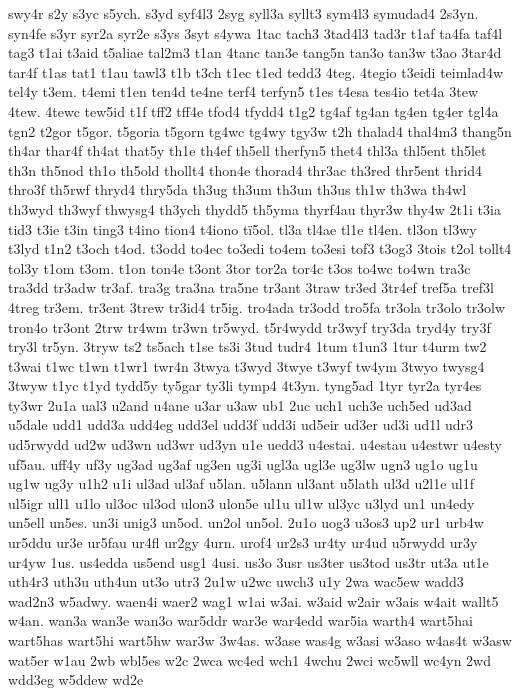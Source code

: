 {swy4r
s2y
s3yc
s5ych.
s3yd
syf4l3
2syg
syll3a
syllt3
sym4l3
symudad4
2s3yn.
syn4fe
s3yr
syr2a
syr2e
s3ys
3syt
s4ywa
1tac
tach3
3tad4l3
tad3r
t1af
ta4fa
taf4l
tag3
t1ai
t3aid
t5aliae
tal2m3
t1an
4tanc
tan3e
tang5n
tan3o
tan3w
t3ao
3tar4d
tar4f
t1as
tat1
t1au
tawl3
t1b
t3ch
t1ec
t1ed
tedd3
4teg.
4tegio
t3eidi
teimlad4w
tel4y
t3em.
t4emi
t1en
ten4d
te4ne
terf4
terfyn5
t1es
t4esa
tes4io
tet4a
3tew
4tew.
4tewc
tew5id
t1f
tff2
tff4e
tfod4
tfydd4
t1g2
tg4af
tg4an
tg4en
tg4er
tgl4a
tgn2
t2gor
t5gor.
t5goria
t5gorn
tg4wc
tg4wy
tgy3w
t2h
thalad4
thal4m3
thang5n
th4ar
thar4f
th4at
that5y
th1e
th4ef
th5ell
therfyn5
thet4
thl3a
thl5ent
th5let
th3n
th5nod
th1o
th5old
thollt4
thon4e
thorad4
thr3ac
th3red
thr5ent
thrid4
thro3f
th5rwf
thryd4
thry5da
th3ug
th3um
th3un
th3us
th1w
th3wa
th4wl
th3wyd
th3wyf
thwysg4
th3ych
thydd5
th5yma
thyrf4au
thyr3w
thy4w
2t1i
t3ia
tid3
t3ie
t3in
ting3
t4ino
tion4
t4iono
tï5ol.
tl3a
tl4ae
tl1e
tl4en.
tl3on
tl3wy
t3lyd
t1n2
t3och
t4od.
t3odd
to4ec
to3edi
to4em
to3esi
tof3
t3og3
3tois
t2ol
tollt4
tol3y
t1om
t3om.
t1on
ton4e
t3ont
3tor
tor2a
tor4c
t3os
to4wc
to4wn
tra3c
tra3dd
tr3adw
tr3af.
tra3g
tra3na
tra5ne
tr3ant
3traw
tr3ed
3tr4ef
tref5a
tref3l
4treg
tr3em.
tr3ent
3trew
tr3id4
tr5ig.
tro4ada
tr3odd
tro5fa
tr3ola
tr3olo
tr3olw
tron4o
tr3ont
2trw
tr4wm
tr3wn
tr5wyd.
t5r4wydd
tr3wyf
try3da
tryd4y
try3f
try3l
tr5yn.
3tryw
ts2
ts5ach
t1se
ts3i
3tud
tudr4
1tum
t1un3
1tur
t4urm
tw2
t3wai
t1wc
t1wn
t1wr1
twr4n
3twya
t3wyd
3twye
t3wyf
tw4ym
3twyo
twysg4
3twyw
t1yc
t1yd
tydd5y
ty5gar
ty3li
tymp4
4t3yn.
tyng5ad
1tyr
tyr2a
tyr4es
ty3wr
2u1a
ual3
u2and
u4ane
u3ar
u3aw
ub1
2uc
uch1
uch3e
uch5ed
ud3ad
u5dale
udd1
udd3a
udd4eg
udd3el
udd3f
udd3i
ud5eir
ud3er
ud3i
ud1l
udr3
ud5rwydd
ud2w
ud3wn
ud3wr
ud3yn
u1e
uedd3
u4estai.
u4estau
u4estwr
u4esty
uf5au.
uff4y
uf3y
ug3ad
ug3af
ug3en
ug3i
ugl3a
ugl3e
ug3lw
ugn3
ug1o
ug1u
ug1w
ug3y
u1h2
u1i
ul3ad
ul3af
u5lan.
u5lann
ul3ant
u5lath
ul3d
u2l1e
ul1f
ul5igr
ull1
u1lo
ul3oc
ul3od
ulon3
ulon5e
ul1u
ul1w
ul3yc
u3lyd
un1
un4edy
un5ell
un5es.
un3i
unig3
un5od.
un2ol
un5ol.
2u1o
uog3
u3os3
up2
ur1
urb4w
ur5ddu
ur3e
ur5fau
ur4fl
ur2gy
4urn.
urof4
ur2s3
ur4ty
ur4ud
u5rwydd
ur3y
ur4yw
1us.
us4edda
us5end
usg1
4usi.
us3o
3usr
us3ter
us3tod
us3tr
ut3a
ut1e
uth4r3
uth3u
uth4un
ut3o
utr3
2u1w
u2wc
uwch3
u1y
2wa
wac5ew
wadd3
wad2n3
w5adwy.
waen4i
waer2
wag1
w1ai
w3ai.
w3aid
w2air
w3ais
w4ait
wallt5
w4an.
wan3a
wan3e
wan3o
war5ddr
war3e
war4edd
war5ia
warth4
wart5hai
wart5has
wart5hi
wart5hw
war3w
3w4as.
w3ase
was4g
w3asi
w3aso
w4as4t
w3asw
wat5er
w1au
2wb
wbl5es
w2c
2wca
wc4ed
wch1
4wchu
2wci
wc5wll
wc4yn
2wd
wdd3eg
w5ddew
wd2e
}
